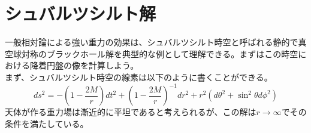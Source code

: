 \documentclass[dvipdfmx]{report} %
\begin{document}
\chapter{シュバルツシルト解}
一般相対論による強い重力の効果は、シュバルツシルト時空と呼ばれる静的で真空球対称のブラックホール解を典型的な例として理解できる。まずはこの時空における降着円盤の像を計算しよう。\\
まず、シュバルツシルト時空の線素は以下のように書くことができる。
\[
ds^2 =
		-\left( 1 - \frac{2M}{r} \right)dt^2
		+ \left( 1 - \frac{2M}{r} \right)^{-1}dr^2
		+ r^2( d\theta^2 + \sin^2\theta d\phi^2 )
\]
天体が作る重力場は漸近的に平坦であると考えられるが、この解は$r \rightarrow \infty$でその条件を満たしている。

\end{document}
